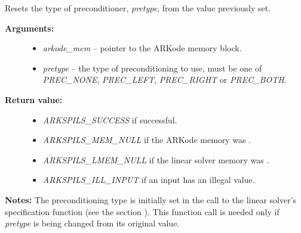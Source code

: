 \documentclass[letterpaper,10pt,english]{sphinxmanual}
\begin{document}

\begin{fulllineitems}
\label{c_interface/User_callable:c.ARKSpilsSetPrecType}
Resets the type of preconditioner, \emph{pretype}, from the value previously set.
\begin{description}
\item[{\textbf{Arguments:}}] \leavevmode\begin{itemize}
\item {} 
\emph{arkode\_mem} -- pointer to the ARKode memory block.

\item {} 
\emph{pretype} -- the type of preconditioning to use, must be one of
\emph{PREC\_NONE}, \emph{PREC\_LEFT}, \emph{PREC\_RIGHT} or \emph{PREC\_BOTH}.

\end{itemize}

\item[{\textbf{Return value:}}] \leavevmode\begin{itemize}
\item {} 
\emph{ARKSPILS\_SUCCESS} if successful.

\item {} 
\emph{ARKSPILS\_MEM\_NULL} if the ARKode memory was .

\item {} 
\emph{ARKSPILS\_LMEM\_NULL} if the linear solver memory was .

\item {} 
\emph{ARKSPILS\_ILL\_INPUT} if an input has an illegal value.

\end{itemize}

\end{description}

\textbf{Notes:} The preconditioning type is initially set in the call to the
linear solver's specification function (see the section
{\hyperref[c_interface/User_callable:cinterface-linearsolvers]{\emph{}}}).  This function call is needed
only if \emph{pretype} is being changed from its original value.

\end{fulllineitems}

\end{document}
